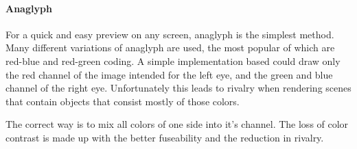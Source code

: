 \paragraph{Anaglyph}
For a quick and easy preview on any screen, anaglyph is the simplest method.
Many different variations of anaglyph are used, the most popular of which are red-blue and red-green coding.
A simple implementation based could draw only the red channel of the image intended for the left eye, and the green and blue channel of the right eye.
Unfortunately this leads to rivalry when rendering scenes that contain objects that consist mostly of those colors.

The correct way is to mix all colors of one side into it's channel.
The loss of color contrast is made up with the better fuseability and the reduction in rivalry.


